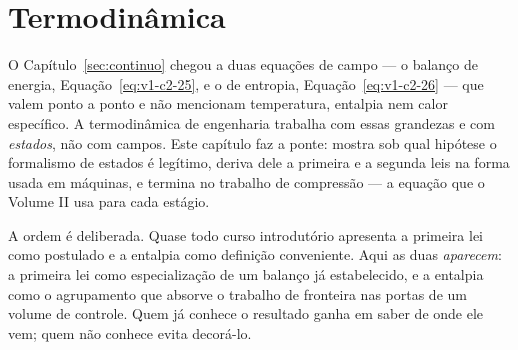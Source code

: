 \documentclass[12pt,a4paper]{article}
\numberwithin{equation}{section}
\numberwithin{table}{section}
\numberwithin{figure}{section}
\begin{document}
\begin{table}[H]
\centering
\caption[Relações constitutivas usadas no volume]{Relações constitutivas para
sólidos elásticos, fluidos newtonianos e condução de calor.}
\label{tab:v1-c2-3}
\small
{}
\end{table}


\section{Termodinâmica}\label{sec:termodinamica}

O Capítulo~\ref{sec:continuo} chegou a duas equações de campo --- o balanço de
energia, Equação~\eqref{eq:v1-c2-25}, e o de entropia,
Equação~\eqref{eq:v1-c2-26} --- que valem ponto a ponto e não mencionam
temperatura, entalpia nem calor específico. A termodinâmica de engenharia
trabalha com essas grandezas e com \emph{estados}, não com campos. Este
capítulo faz a ponte: mostra sob qual hipótese o formalismo de estados é
legítimo, deriva dele a primeira e a segunda leis na forma usada em máquinas, e
termina no trabalho de compressão --- a equação que o Volume II usa para cada
estágio.

A ordem é deliberada. Quase todo curso introdutório apresenta a primeira lei
como postulado e a entalpia como definição conveniente. Aqui as duas
\emph{aparecem}: a primeira lei como especialização de um balanço já
estabelecido, e a entalpia como o agrupamento que absorve o trabalho de
fronteira nas portas de um volume de controle. Quem já conhece o resultado
ganha em saber de onde ele vem; quem não conhece evita decorá-lo.
\end{document}
